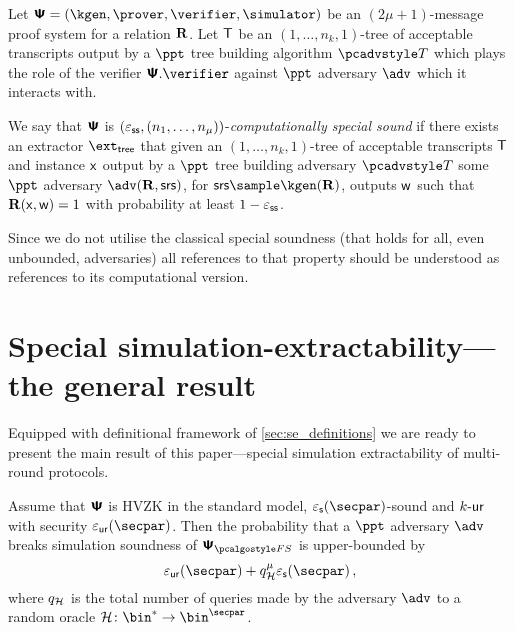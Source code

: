 \documentclass[runningheads,11pt]{llncs}
\begin{document}
\begin{definition}
  Let $\proofsystem = (\kgen, \prover, \verifier, \simulator)$ be an
  $(2 \mu + 1)$-message proof system for a relation $\mathbf{R}$. Let $\mathsf{T}$ be an
  $(1, \ldots, n_k, 1)$-tree of acceptable transcripts output by a $\ppt$ tree
  building algorithm $\tdv$ which plays the role of the verifier $\ps.\verifier$
  against $\ppt$ adversary $\adv$ which it interacts with.

  We say that
  $\bm{\mathsf{\Psi}}$ is $(\varepsilon_{\mathsf{ss}}, (n_1, \ldots, n_\mu))$-\emph{computationally special sound}
  if there exists an extractor $\extt$ that given an $(1, \ldots, n_k, 1)$-tree
  of acceptable transcripts $\mathsf{T}$ and instance $\mathsf{x}$ output by a $\ppt$ tree
  building adversary $\tdv$ some $\ppt$ adversary $\adv(\REL,
  \srs)$, for $\srs \sample \kgen(\REL)$, outputs $\mathsf{w}$ such that $\mathbf{R}(\mathsf{x},
  \mathsf{w}) = 1$ with probability at least $1 - \varepsilon_{\mathsf{ss}}$.
\end{definition}

Since we do not utilise the classical special soundness (that holds for all,
even unbounded, adversaries) all references to that property should be
understood as references to its computational version.


\section{Special simulation-extractability---the general result}
\label{sec:general}
Equipped with definitional framework of \cref{sec:se_definitions} we are ready
to present the main result of this paper---special simulation extractability of
multi-round protocols.

\begin{theorem}
  \label{thm:simsnd}
  Assume that $\bm{\mathsf{\Psi}}$ is HVZK in the standard model, $\epss(\secpar)$-sound and
  ${k\text{-}\mathsf{ur}}$ with security $\epsur(\secpar)$. Then the probability
  that a $\ppt$ adversary $\adv$ breaks simulation soundness of $\ps_{\fs}$ is
  upper-bounded by
  \[
    \epsur(\secpar) + q_\ro^\mu  \epss(\secpar)\,,
  \]
  where $q_{\mathcal{H}}$ is the total number of queries made by the adversary $\adv$ to a
  random oracle $\ro\colon \bin^{*} \to \bin^{\secpar}$.
\end{theorem}
\end{document}
